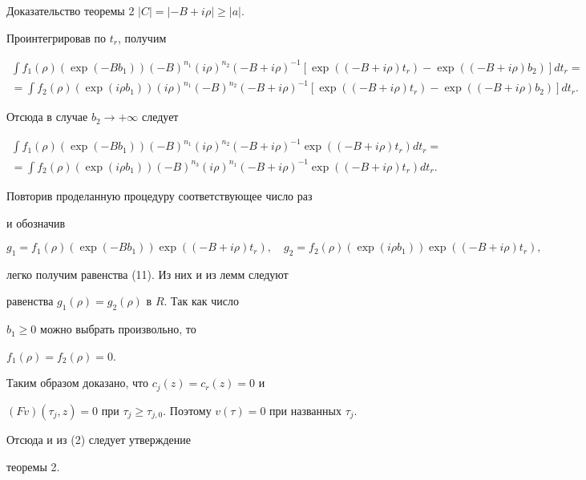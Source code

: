 \begin{pf*}{Доказательство теоремы 2}
$|C|=|-B+i\rho|\ge|a|$.





Проинтегрировав по $ t_{r}$, получим


\begin{multline*}


\int f_{1}(\rho) (\exp (-Bb_{1})) (-B)^{n_{1}}


(i\rho)^{n_{2}}(-B+i\rho)^{-1}


 [\exp ((-B +i\rho) t_{r})-


\exp ((-B+i\rho)b_{2})]d t_{r} = \\


= \int f_{2}(\rho)(\exp(i\rho b_{1})) (i\rho)^{n_{1}}


(-B)^{n_{2}}(-B+i\rho)^{-1}


[ \exp((-B+i\rho)


t_{r})-\exp((-B+i\rho)b_{2}) ]d t_{r}.


\end{multline*}


Отсюда в случае $b_{2} \to +\infty$ следует


\begin{multline*}


\int f_{1}(\rho)( \exp (-Bb_{1})) (-B)^{n_{1}} (i\rho)^{n_{2}}


(-B+i\rho)^{-1} \exp ((-B+


i\rho) t_{r}) d t_{r}= \\


= \int f_{2}(\rho) (\exp (i\rho b_{1})) (-B)^{n_{3}} (i\rho)^{n_{1}}


(-B+i\rho)^{-1} \exp ((-B+


i\rho) t_{r}) d t_{r}.


\end{multline*}


Повторив проделанную процедуру соответствующее число раз


и обозначив


$$


g_{1}= f_{1}(\rho) (\exp (-Bb_{1})) \exp ((-B+i\rho) t_{r}), \quad


g_{2}=f_{2}(\rho) (\exp (i\rho b_{1})) \exp ((-B+i\rho) t_{r}),


$$


легко получим равенства (11). Из них и из лемм следуют


равенства $ g_{1}(\rho)=g_{2}(\rho)$ в $R$. Так как число


$b_{1} \ge 0 $ можно выбрать произвольно, то


$f_{1}(\rho)=f_{2}(\rho)=0. $


Таким образом доказано, что $c_{j}(z) =c_{r}(z) =0$ и


$(F v)(\tau_{j}, z)=0$ при $\tau_{j}


\ge \tau_{j, 0}$. Поэтому $ v (\tau)=0$ при названных $\tau_{j}$.


Отсюда и из (2) следует утверждение


теоремы 2. 


\end{pf*}





